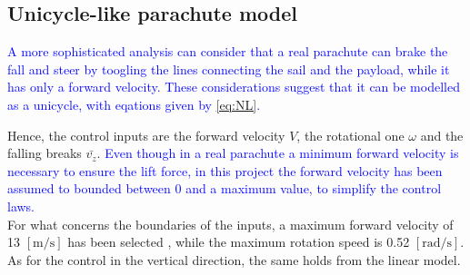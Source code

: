 \subsection{Unicycle-like parachute model} \label{unicyle}
\textcolor{blue}{A more sophisticated analysis can consider that a real parachute can brake the fall and steer by toogling the lines connecting the sail and the payload, while it has only a forward velocity. These considerations suggest that it can be modelled as a unicycle, with eqations given by \autoref{eq:NL}.}

Hence, the control inputs are the forward velocity $V$, the rotational one $\omega$ and the falling breaks $\bar{v_z}$. 
\textcolor{blue}{Even though in a real parachute a minimum forward velocity is necessary to ensure the lift force, in this project the forward velocity has been assumed to bounded between 0 and a maximum value, to simplify the control laws.}\\
For what concerns the boundaries of the inputs, a maximum forward velocity of 13 $\left[\si{\meter\per\second}\right]$ has been selected \cite{b7} \cite{b10}, while the maximum rotation speed is 0.52 $\left[\si{\radian\per\second}\right]$. As for the control in the vertical direction, the same holds from the linear model.\\